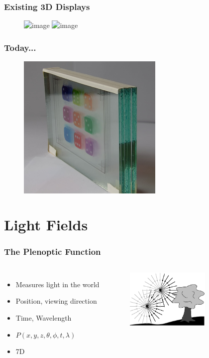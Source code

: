 \documentclass[12pt, compress]{beamer}
\begin{document}
\begin{frame}[fragile]
	\frametitle{Existing 3D Displays}
	
	\begin{figure}
		\includegraphics<1>[width=5cm]{figures/overview_displays/3d_glasses}
		\includegraphics<2>[width=5cm]{figures/overview_displays/no_3d_glasses}
	\end{figure}

\end{frame}

\begin{frame}[fragile]
	\frametitle{Today...}
	
	\begin{figure}
		\includegraphics[height=7cm]{images/glass_plates_front_view_cropped}
	\end{figure}
\end{frame}

\section{Light Fields}

\begin{frame}[fragile]
	\frametitle{The Plenoptic Function}
	
	\begin{columns}[onlytextwidth]
			\begin{itemize}[<alert@+>]
				\item Measures light in the world
				\item Position, viewing direction
				\item Time, Wavelength
				\item $P(x, y, z, \theta, \phi, t, \lambda)$
				\item 7D
			\end{itemize}
			\begin{figure}
				\includegraphics[width = 4cm]{images/plenoptic.png}
				\caption*{\cite{AdelsonBergen}}
			\end{figure}
	\end{columns}
	
\end{frame}
\end{document}
